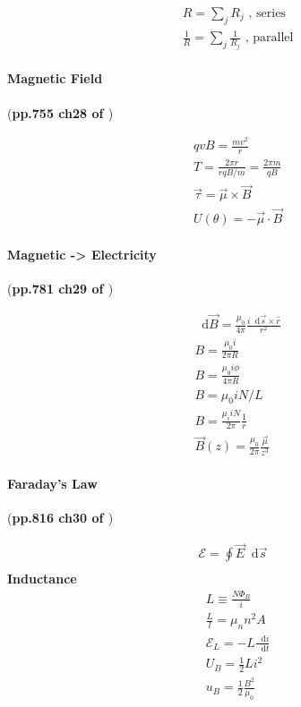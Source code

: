 \documentclass{article}
\newcommand*\diff{\mathop{}\!\mathrm{d}}
\numberwithin{equation}{subsection} %
\theoremstyle{definition}
\begin{document}
\begin{align}
    & R = \sum_j R_j \text{ , series} \\
    & \frac{1}{R} = \sum_j \frac{1}{R_j} \text{ , parallel}
\end{align}

\paragraph{Magnetic Field} (\textbf{pp.755 ch28 of \cite{book}})

\begin{align}
    & qvB = \frac{mv^2}{r} \\
    & T = \frac{2\pi r}{ rqB / m} = \frac{2\pi m}{qB} \\
    & \vec\tau = \vec{\mu} \times \vec{B} \\
    & U(\theta) = -\vec\mu \cdot \vec B
\end{align}

\paragraph{Magnetic -> Electricity} (\textbf{pp.781 ch29 of
\cite{book}})

\begin{align}
    & \diff \vec{B} = \frac{\mu_0}{4\pi}
        \frac{i\diff \vec{s}\times\hat{r}}{r^2} \\
    & B = \frac{\mu_0 i}{2\pi R} \\
    & B = \frac{\mu_0 i \phi}{4\pi R} \\
    & B = \mu_0 i N/L \\
    & B = \frac{\mu_i i N}{2\pi}\frac{1}{r} \\
    & \vec{B}(z) = \frac{\mu_0}{2\pi}\frac{\vec{\mu}}{z^3}
\end{align}

\paragraph{Faraday's Law} (\textbf{pp.816 ch30 of \cite{book}})

\begin{align}
    \mathcal{E} = \oint \vec{E} \diff \vec{s} \\
\end{align}
\textbf{Inductance}
\begin{align}
    & L \equiv \frac{N\Phi_B}{i} \\
    & \frac{L}{l} = \mu_n n^2 A \\
    & \mathcal{E}_L = - L\frac{\diff i}{\diff t} \\
    & U_B = \frac{1}{2} L i^2 \\
    & u_B = \frac{1}{2} \frac{B^2}{\mu_0} 
\end{align}
\end{document}

